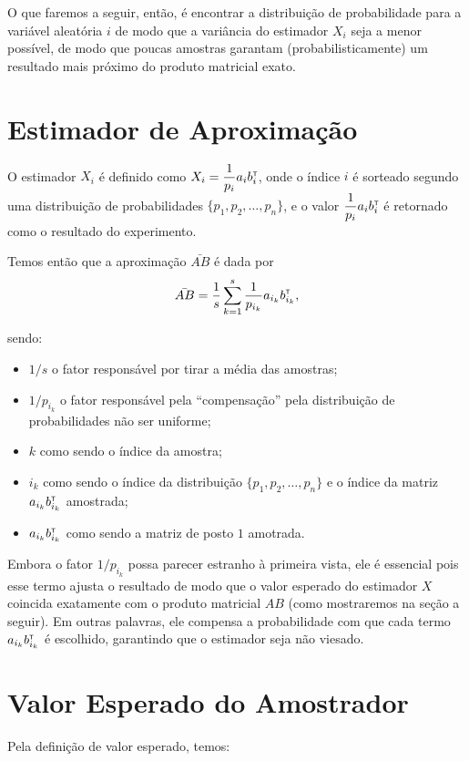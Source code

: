 O que faremos a seguir, então, é encontrar a distribuição de probabilidade para a variável aleatória $i$ de modo que a variância do estimador $X_i$ seja a menor possível, de modo que poucas amostras garantam (probabilisticamente) um resultado mais próximo do produto matricial exato.

\section{Estimador de Aproximação}

  O estimador $X_i$ é definido como $X_i = \dfrac{1}{p_i} a_i b_i^{\scriptscriptstyle\mathsf{T}\mkern-1mu}$, onde o índice $i$ é sorteado segundo uma distribuição de probabilidades $\{p_1, p_2, \dots, p_n\}$, e o valor $\dfrac{1}{p_i} a_i b_i^{\scriptscriptstyle\mathsf{T}\mkern-1mu}$ é retornado como o resultado do experimento.

  Temos então que a aproximação $\bar{AB}$ é dada por \[\bar{AB} = \dfrac{1}{s} \sum_{k=1}^s \dfrac{1}{p_{i_k}} a_{i_{k}} b_{i_{k}}^{\scriptscriptstyle\mathsf{T}\mkern-1mu},\]

  sendo:

  \begin{itemize}
    \item $1/s$ o fator responsável por tirar a média das amostras;
    \item $1/p_{i_{k}}$ o fator responsável pela ``compensação'' pela distribuição de probabilidades não ser uniforme;
    \item $k$ como sendo o índice da amostra;
    \item $i_k$ como sendo o índice da distribuição $\{p_1, p_2, \dots, p_n\}$ e o índice da matriz $a_{i_{k}}b_{i_{k}}^{\scriptscriptstyle\mathsf{T}\mkern-1mu}$ amostrada;
    \item $a_{i_{k}}b_{i_{k}}^{\scriptscriptstyle\mathsf{T}\mkern-1mu}$ como sendo a matriz de posto $1$ amotrada.
  \end{itemize}

  Embora o fator $1/p_{i_{k}}$ possa parecer estranho à primeira vista, ele é essencial pois esse termo ajusta o resultado de modo que o valor esperado do estimador $X$ coincida exatamente com o produto matricial $AB$ (como mostraremos na seção a seguir). Em outras palavras, ele compensa a probabilidade com que cada termo $a_{i_{k}} b_{i_{k}}^{\scriptscriptstyle\mathsf{T}\mkern-1mu}$ é escolhido, garantindo que o estimador seja não viesado.

\section{Valor Esperado do Amostrador}

  Pela definição de valor esperado, temos:

